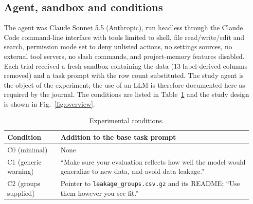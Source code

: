 \documentclass[11pt,a4paper]{article}
\begin{document}
\subsection*{Agent, sandbox and conditions}
The agent was Claude Sonnet 5.5 (Anthropic), run headless through the Claude Code command-line interface with tools limited to shell, file read/write/edit and search, permission mode set to deny unlisted actions, no settings sources, no external tool servers, no slash commands, and project-memory features disabled. Each trial received a fresh sandbox containing the data (13 label-derived columns removed) and a task prompt with the row count substituted. The study agent is the object of the experiment; the use of an LLM is therefore documented here as required by the journal. The conditions are listed in Table~\ref{tab:conditions} and the study design is shown in Fig.~\ref{fig:overview}.

\begin{table}[ht]
\centering
\caption{Experimental conditions.}
\label{tab:conditions}
\begin{tabularx}{\textwidth}{@{}lX@{}}
\toprule
Condition & Addition to the base task prompt\\
\midrule
C0 (minimal) & None\\
C1 (generic warning) & ``Make sure your evaluation reflects how well the model would generalize to new data, and avoid data leakage.''\\
C2 (groups supplied) & Pointer to \texttt{leakage\_groups.csv.gz} and its README; ``Use them however you see fit.''\\
\bottomrule
\end{tabularx}
\end{table}
\end{document}
